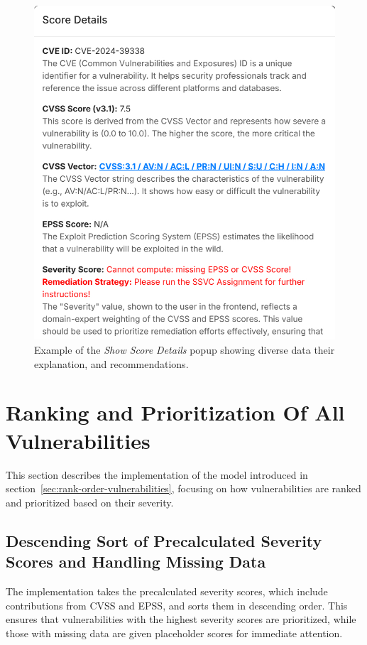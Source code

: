 \begin{figure}[H]
    \centering
    \includegraphics[scale=0.45, trim=2mm 2mm 2mm 2mm, clip]{resources/Score_Details_Button.PNG}
    \caption{Example of the \textit{Show Score Details} popup showing diverse data their explanation, and recommendations.}
    \label{fig:score-details}
\end{figure}

\section{Ranking and Prioritization Of All Vulnerabilities}
\label{sec:ranking-implementation}

This section describes the implementation of the model introduced in section~\ref{sec:rank-order-vulnerabilities}, focusing on how vulnerabilities are ranked and prioritized based on their severity.

\subsection{Descending Sort of Precalculated Severity Scores and Handling Missing Data}
The implementation takes the precalculated severity scores, which include contributions from \ac{CVSS} and \ac{EPSS}, and sorts them in descending order. This ensures that vulnerabilities with the highest severity scores are prioritized, while those with missing data are given placeholder scores for immediate attention.

